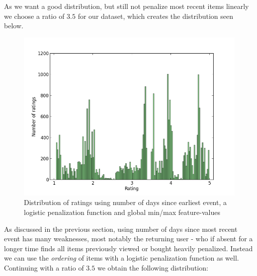 As we want a good distribution, but still not penalize most recent items
linearly we choose a ratio of $3.5$ for our dataset, which creates the
distribution seen below.

\begin{figure}[H]
  \centering
  \includegraphics[scale=0.5]{image/dist-sigmoid-fixed-recentness-3-5}
  \caption[Distribution of ratings using number of days since earliest event]{Distribution of ratings using number of days since earliest event,
  a logistic penalization function and global min/max feature-values}
  \label{fig:dist-recentness-sigmoid}
\end{figure}

As discussed in the previous section, using number of days since most recent
event has many weaknesses, most notably the returning user - who if absent for
a longer time finds all items previously viewed or bought heavily penalized.
Instead we can use the \textit{ordering} of items with a logistic penalization
function as well. Continuing with a ratio of $3.5$ we obtain the following
distribution:

